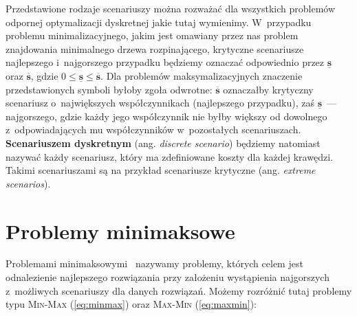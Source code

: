 Przedstawione rodzaje scenariuszy można rozważać dla wszystkich problemów odpornej optymalizacji dyskretnej jakie tutaj wymienimy.
W~przypadku problemu minimalizacyjnego, jakim jest omawiany przez nas problem znajdowania minimalnego drzewa rozpinającego, krytyczne scenariusze najlepszego i~najgorszego przypadku będziemy oznaczać odpowiednio przez $\underline{\textbf{s}}$ oraz $\overline{\textbf{s}}$, gdzie $0 \leqslant \underline{\textbf{s}} \leqslant \overline{\textbf{s}}$.
Dla problemów maksymalizacyjnych znaczenie przedstawionych symboli byłoby zgoła odwrotne: $\overline{\textbf{s}}$ oznaczałby krytyczny scenariusz o~największych współczynnikach (najlepszego przypadku), zaś $\underline{\textbf{s}}$~--- najgorszego, gdzie każdy jego współczynnik nie byłby większy od dowolnego z~odpowiadających mu współczynników w~pozostałych scenariuszach.
\textbf{Scenariuszem dyskretnym} (ang. \textit{discrete scenario}) będziemy natomiast nazywać każdy scenariusz, który ma zdefiniowane koszty dla każdej krawędzi.
Takimi scenariuszami są na przykład scenariusze krytyczne (ang. \textit{extreme scenarios}).




\section{Problemy minimaksowe}




Problemami minimaksowymi~\cite[$428$]{minmaxSurvey} nazywamy problemy, których celem jest odnalezienie najlepszego rozwiązania przy założeniu wystąpienia najgorszych z~możliwych scenariuszy dla danych rozwiązań.
Możemy rozróżnić tutaj problemy typu \textsc{Min-Max} (\ref{eq:minmax}) oraz \textsc{Max-Min} (\ref{eq:maxmin}):

